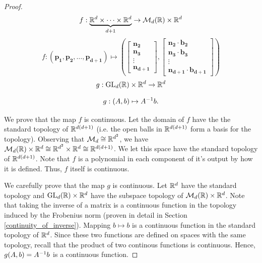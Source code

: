 \documentclass[letterpaper,titlepage]{article}
\begin{document}
\begin{proof}
        $$f:\underbrace{\mathbb{R}^d \times \dots \times \mathbb{R}^d}_{d+1} \to \mathcal{M}_{d}(\mathbb{R})\times \mathbb{R}^d$$
        $$f:(\mathbf{p_1},\mathbf{p_2},\dots,\mathbf{p_{d+1}}) \mapsto \left(\begin{bmatrix}
            \mathbf{n_2}\\ \mathbf{n_3}\\ \vdots\\ \mathbf{n_{d+1}}
        \end{bmatrix},
        \begin{bmatrix}
            \mathbf{n_2}\cdot\mathbf{b_2} \\ \mathbf{n_3}\cdot\mathbf{b_3}\\ \vdots \\ \mathbf{n_{d+1}}\cdot\mathbf{b_{d+1}}
        \end{bmatrix}\right)$$
        $$g:\text{GL}_d(\mathbb{R})\times \mathbb{R}^d \to \mathbb{R}^d$$
       
            
        $$g:(A,b) \mapsto A^{-1} b.$$
    
        We prove that the map $f$ is continuous. Let the domain of $f$ have the the standard topology of $\mathbb{R}^{d(d+1)}$ (i.e. the open balls in $\mathbb{R}^{d(d+1)}$ form a basis for the topology). Observing that $\mathcal{M}_{d} \cong \mathbb{R}^{d^2}$, we have $\mathcal{M}_{d}(\mathbb{R})\times \mathbb{R}^d \cong \mathbb{R}^{d^2}\times \mathbb{R}^d \cong \mathbb{R}^{d(d+1)}$. We let this space have the standard topology of $\mathbb{R}^{d(d+1)}$. Note that $f$ is a polynomial in each component of it's output by how it is defined. Thus, $f$ itself is continuous.

        We carefully prove that the map $g$ is continuous. Let $\mathbb{R}^d$ have the standard topology and $\text{GL}_d(\mathbb{R})\times \mathbb{R}^d$ have the subspace topology of $\mathcal{M}_{d}(\mathbb{R})\times \mathbb{R}^d$. Note that taking the inverse of a matrix is a continuous function in the topology induced by the Frobenius norm (proven in detail in Section \ref{continuity_of_inverse}). Mapping $b \mapsto b$ is a continuous function in the standard topology of $\mathbb{R}^d$. Since these two functions are defined on spaces with the same topology, recall that the product of two continous functions is continuous. Hence, $g(A,b)=A^{-1} b$ is a continuous function.
        

\end{proof}
\end{document}
